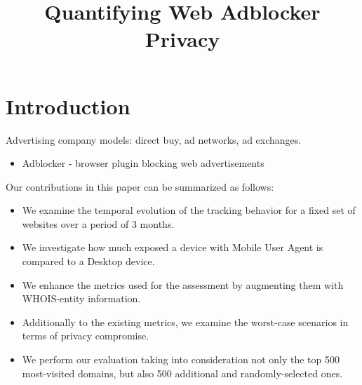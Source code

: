\documentclass{sig-alternate}
\begin{document}
\title{Quantifying Web Adblocker Privacy}
\author{}


\maketitle

\begin{abstract}
\end{abstract}

\section{Introduction} \label{sec:introduction}

Advertising company models: direct buy, ad networks, ad exchanges.

\begin{itemize}
\item Adblocker - browser plugin blocking web advertisements
\end{itemize}

{\color{blue}
 Our contributions in this paper can be summarized as follows:
 \begin{itemize}
 \item We examine the temporal evolution of the tracking behavior for a fixed set of websites over a period of 3 months.
 \item We investigate how much exposed a device with Mobile User Agent is compared to a Desktop device.
 \item We enhance the metrics used for the assessment by augmenting them with WHOIS-entity information.
 \item Additionally to the existing metrics, we examine the worst-case scenarios in terms of privacy compromise.
 \item We perform our evaluation taking into consideration not only the top 500 most-visited domains, but also 500 additional and randomly-selected ones.
 \end{itemize}
}
\end{document}
